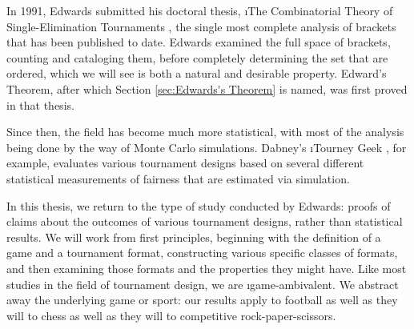 {       %


    In 1991, Edwards submitted his doctoral thesis, \i{The Combinatorial Theory of Single-Elimination Tournaments} \cite{montana}, the single most complete analysis of brackets that has been published to date. Edwards examined the full space of brackets, counting and cataloging them, before completely determining the set that are ordered, which we will see is both a natural and desirable property. Edward's Theorem, after which Section \ref{sec:Edwards's Theorem} is named, was first proved in that thesis.

    Since then, the field has become much more statistical, with most of the analysis being done by the way of Monte Carlo simulations. Dabney's \i{Tourney Geek} \cite{geek}, for example, evaluates various tournament designs based on several different statistical measurements of fairness that are estimated via simulation.
    
    In this thesis, we return to the type of study conducted by Edwards: proofs of claims about the outcomes of various tournament designs, rather than statistical results. We will work from first principles, beginning with the definition of a game and a tournament format, constructing various specific classes of formats, and then examining those formats and the properties they might have. Like most studies in the field of tournament design, we are \i{game-ambivalent}. We abstract away the underlying game or sport: our results apply to football as well as they will to chess as well as they will to competitive rock-paper-scissors.
}
